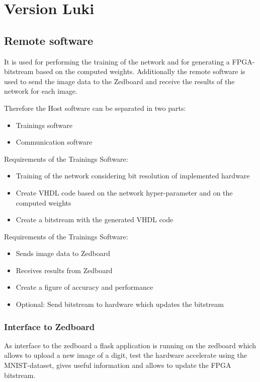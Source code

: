 \section{Version Luki}
\subsection{Remote software}

It is used for performing the training of the network and for generating a FPGA-bitstream based on the computed weights. Additionally the remote software is used to send the image data to the Zedboard and receive the results of the network for each image. 

Therefore the Host software can be separated in two parts:
\begin{itemize}
	\item Trainings software
	\item Communication software
\end{itemize} 

Requirements of the Trainings Software:
\begin{itemize} 
	\item Training of the network considering bit resolution of implemented hardware
	\item Create VHDL code based on the network hyper-parameter and on the computed weights
	\item Create a bitstream with the generated VHDL code
\end{itemize}

Requirements of the Trainings Software:
\begin{itemize}
	\item Sends image data to Zedboard
	\item Receives results from Zedboard
	\item Create a figure of accuracy and performance   
	\item Optional: Send bitstream to hardware which updates the bitstream 
\end{itemize}

\subsubsection{Interface to Zedboard} \label{subsec:InterfaceRemoteZed}
As interface to the zedboard a flask application is running on the zedboard which allows to upload a new image of a digit, test the hardware accelerate using the MNIST-dataset, gives useful information and allows to update the FPGA bitstream. 

